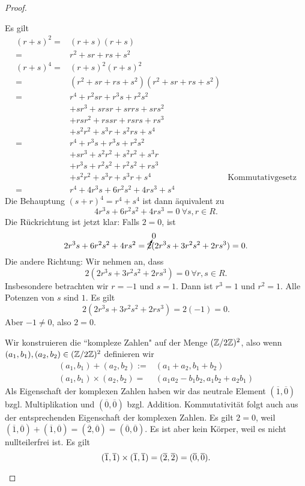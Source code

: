 \begin{proof}
	\begin{parts}
	\item Es gilt
		\begin{align*}
			(r+s)^2=&(r+s)(r+s)\\
			=&r^2+s r+rs+s^2\\
			(r+s)^4=&(r+s)^2(r+s)^2\\
			=&(r^2+s r+rs+s^2)(r^2+s r+rs+s^2)\\
			=&r^4+r^2 s r+r^3 s + r^2s^2\\
			 &+s r^3+s r s r+s r r s+s r s^2\\
			 &+r s r^2+rss r+rs rs+ rs^3\\
			 &+s^2r^2+s^3 r+s^2 rs+s^4\\
			=&r^4 + r^3s+r^3s+r^2s^2\\
			 &+s r^3+ s^2r^2 + s^2 r^2 + s^3 r\\
			 &+r^3 s + r^2 s^2+ r^2 s^2 + r s^3\\
			 &+s^2r^2 + s^3 r + s^3 r + s^4 & \text{Kommutativgesetz}\\
			=&r^4+4r^3 s+6r^2 s^2+4r s^3+s^4
		\end{align*}
		Die Behauptung $(s+r)^4=r^4+s^4$ ist dann äquivalent zu
		\[
		4r^3s+6r^2s^2+4rs^3=0~\forall s,r\in R
		.\] 
		Die Rückrichtung ist jetzt klar: Falls $2=0$, ist
		\[
			2r^3s+6r^2s^2+4rs^2=\cancelto{0}{2}(2r^3s+3r^2s^2+2rs^3)=0
		.\] 
		Die andere Richtung: Wir nehmen an, dass
		\[
		2(2r^3s+3r^2s^2+2rs^3)=0~\forall r,s\in R
		.\] 
		Insbesondere betrachten wir $r=-1$ und $s=1$. Dann ist $r^3=1$ und $r^2=1$. Alle Potenzen von $s$ sind $1$. Es gilt
		\[
		2(2r^3 s+3r^2s^2+2 rs^3)=2(-1)=0
		.\] 
		Aber $-1\neq 0$, also $2=0$.
	\item Wir konstruieren die ``kompleze Zahlen" auf der Menge $(\mathbb{Z} / 2 \mathbb{Z})^2$, also wenn $(a_1,b_1), (a_2,b_2)\in (\mathbb{Z} / 2\mathbb{Z})^2$ definieren wir
		\begin{align*}
			(a_1,b_1)+(a_2,b_2):=&(a_1+a_2,b_1+b_2)\\
			(a_1,b_1)\times (a_2,b_2)=&(a_1a_2-b_1b_2,a_1b_2+a_2b_1)
		\end{align*}
		Als Eigenschaft der komplexen Zahlen haben wir das neutrale Element $(\overline{1},\overline{0})$ bzgl. Multiplikation und $(\overline{0},\overline{0})$ bzgl. Addition. Kommutativität folgt auch aus der entsprechenden Eigenschaft der komplexen Zahlen. Es gilt $2=0$, weil $(\overline{1},\overline{0})+(\overline{1},\overline{0})=(\overline{2},\overline{0})=(\overline{0},\overline{0})$. Es ist aber kein Körper, weil es nicht nullteilerfrei ist. Es gilt
		\[
			(\overline{1},\overline{1})\times (\overline{1},\overline{1})=(\overline{2},\overline{2})=(\overline{0},\overline{0})
		.\qedhere\] 
	\end{parts}
\end{proof}
